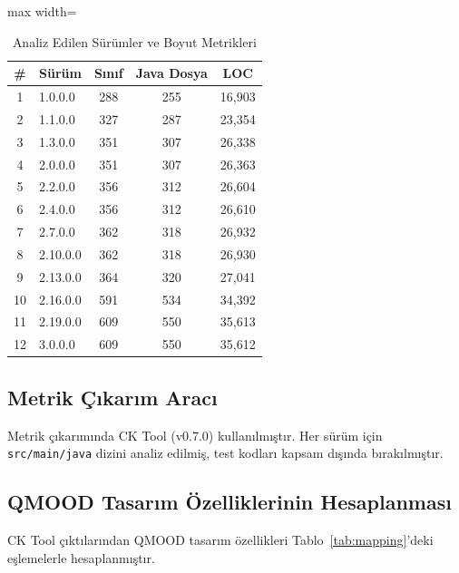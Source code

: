 \documentclass[conference]{IEEEtran}
\begin{document}
\begin{table}[htbp]
\caption{Analiz Edilen S\"ur\"umler ve Boyut Metrikleri}
\label{tab:versions}
\centering
\begin{adjustbox}{max width=\columnwidth}
\begin{tabular}{clccc}
\toprule
\# & S\"ur\"um & S{\i}n{\i}f & Java Dosya & LOC \\
\midrule
1 & 1.0.0.0 & 288 & 255 & 16{,}903 \\
2 & 1.1.0.0 & 327 & 287 & 23{,}354 \\
3 & 1.3.0.0 & 351 & 307 & 26{,}338 \\
4 & 2.0.0.0 & 351 & 307 & 26{,}363 \\
5 & 2.2.0.0 & 356 & 312 & 26{,}604 \\
6 & 2.4.0.0 & 356 & 312 & 26{,}610 \\
7 & 2.7.0.0 & 362 & 318 & 26{,}932 \\
8 & 2.10.0.0 & 362 & 318 & 26{,}930 \\
9 & 2.13.0.0 & 364 & 320 & 27{,}041 \\
10 & 2.16.0.0 & 591 & 534 & 34{,}392 \\
11 & 2.19.0.0 & 609 & 550 & 35{,}613 \\
12 & 3.0.0.0 & 609 & 550 & 35{,}612 \\
\bottomrule
\end{tabular}
\end{adjustbox}
\end{table}

\subsection{Metrik \c{C}{\i}kar{\i}m Arac{\i}}
Metrik \c{c}{\i}kar{\i}m{\i}nda CK Tool (v0.7.0) \cite{aniche2015} kullan{\i}lm{\i}\c{s}t{\i}r. Her s\"ur\"um i\c{c}in \texttt{src/main/java} dizini analiz edilmi\c{s}, test kodlar{\i} kapsam d{\i}\c{s}{\i}nda b{\i}rak{\i}lm{\i}\c{s}t{\i}r.

\subsection{QMOOD Tasar{\i}m \"Ozelliklerinin Hesaplanmas{\i}}
CK Tool \c{c}{\i}kt{\i}lar{\i}ndan QMOOD tasar{\i}m \"ozellikleri Tablo~\ref{tab:mapping}'deki e\c{s}lemelerle hesaplanm{\i}\c{s}t{\i}r.
\end{document}
